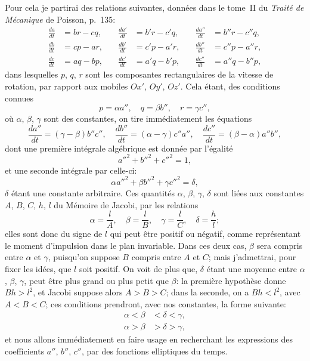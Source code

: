 \documentclass[11pt,leqno,oneside,letterpaper]{book}[2005/09/16]
\begin{document}
Pour cela je partirai des relations suivantes, donn\'ees dans le tome~II
du \textit{Trait\'e de M\'ecanique} de Poisson, p.~135:
\begin{align*}
  \frac{da  }{dt} &= b  r - c  q,\quad
& \frac{da' }{dt} &= b' r - c' q,\quad
& \frac{da''}{dt} &= b''r - c''q,
\\
  \frac{db  }{dt} &= c  p - a  r,\quad
& \frac{db' }{dt} &= c' p - a' r,\quad
& \frac{db''}{dt} &= c''p - a''r,
\\
  \frac{dc  }{dt} &= a  q - b  p,\quad
& \frac{dc' }{dt} &= a' q - b' p,\quad
& \frac{dc''}{dt} &= a''q - b''p,
\end{align*}
dans lesquelles $p$, $q$, $r$ sont les composantes rectangulaires de la vitesse de
rotation, par rapport aux mobiles $Ox'$, $Oy'$, $Oz'$. Cela \'etant, des conditions
connues
\[
  p = \alpha a'', \quad  q = \beta b'', \quad  r = \gamma c'',
\]
o\`u $\alpha$, $\beta$, $\gamma$ sont des constantes, on tire imm\'ediatement les \'equations
\[
  \frac{da''}{dt} = (\gamma - \beta )b''c'',\quad
  \frac{db''}{dt} = (\alpha - \gamma)c''a'',\quad
  \frac{dc''}{dt} = (\beta  - \alpha)a''b'',
\]
dont une premi\`ere int\'egrale alg\'ebrique est donn\'ee par l'\'egalit\'e
\[
  a''^2 + b''^2 + c''^2 = 1,
\]
et une seconde int\'egrale par celle-ci:
\[
  \alpha a''^2 + \beta b''^2 + \gamma c''^2 = \delta,
\]
$\delta$ \'etant une constante arbitraire. Ces quantit\'es $\alpha$, $\beta$, $\gamma$, $\delta$ sont li\'ees aux
constantes $A$, $B$, $C$, $h$, $l$ du M\'emoire de Jacobi, par les relations
\[
  \alpha = \frac{l}{A},\quad
  \beta  = \frac{l}{B},\quad
  \gamma = \frac{l}{C},\quad
  \delta = \frac{h}{l};
\]
elles sont donc du signe de $l$ qui peut \^etre positif ou n\'egatif, comme
re\-pr\'esentant le moment d'impulsion dans le plan invariable. Dans ces
deux cas, $\beta$ sera compris entre $\alpha$ et $\gamma$, puisqu'on
suppose $B$ compris entre $A$ et $C$;
mais j'admettrai, pour fixer les id\'ees, que $l$ soit positif. On voit de plus que,
$\delta$ \'etant une moyenne entre $\alpha$, $\beta$, $\gamma$, peut
\^etre plus grand ou plus petit que $\beta$: la premi\`ere hypoth\`ese
donne $Bh > l^2$, et Jacobi suppose alors $A > B > C$; dans la seconde,
on a $Bh < l^2$, avec $A < B < C$; ces conditions  prendront, avec nos
constantes, la forme suivante:
\begin{align*}
\tag*{I. } \alpha < \beta &< \delta < \gamma,\\
\tag*{II.} \alpha > \beta &> \delta > \gamma,
\end{align*}
et nous allons imm\'ediatement en faire usage en recherchant les expressions
des coefficients $a''$, $b''$, $c''$, par des fonctions elliptiques du temps.
\end{document}
